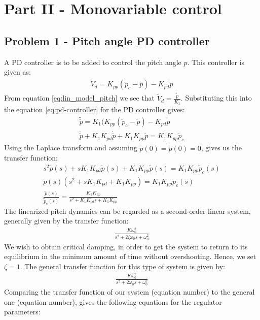 \section{Part II - Monovariable control}
\subsection{Problem 1 - Pitch angle PD controller}
A PD controller is to be added to control the pitch angle $p$. This controller is given as:
\begin{gather}
    \tilde{V}_d = K_{pp}(\tilde{p}_c-\tilde{p})-K_{pd}{\dot{\tilde{p}}}\label{eq:pd-controller}
\end{gather}
From equation \eqref{eq:lin_model_pitch} we see that $\tilde{V}_d = \frac{\ddot{\tilde{p}}}{K_1}.$ Substituting this into the equation \eqref{eq:pd-controller} for the PD controller gives:
\begin{gather*}
    \tilde{\ddot{p}} = K_1(K_{pp}(\tilde{p}_c - \tilde{p}) - K_{pd}\tilde{\dot{p}} \\
    \ddot{\tilde{p}} + K_1K_{pd}\dot{\tilde{p}} + K_1K_{pp}\tilde{p} = K_1 K_{pp} \tilde{p}_c
\end{gather*}
Using the Laplace transform and assuming $\tilde{p}(0) = \dot{\tilde{p}}(0) = 0$, gives us the transfer function:
\begin{gather*}
    s^2\tilde{p}(s) + sK_1K_{pd}\tilde{p}(s) + K_1K_{pp}\tilde{p}(s) = K_1K_{pp}\tilde{p}_c(s) \\
    \tilde{p}(s)(s^2 + sK_1K_{pd} + K_1K_{pp}) = K_1K_{pp}\tilde{p}_c(s) \\
    \frac{\tilde{p}(s)}{\tilde{p}_c(s)} = \frac{K_1K_{pp}}{s^2 + K_1K_{pd}s + K_1K_{pp}}
\end{gather*}
The linearized pitch dynamics can be regarded as a second-order linear system, generally given by the transfer function:
\begin{gather*}
    \frac{K\omega_0^2}{s^2 + 2\zeta\omega_0s + \omega_0^2}
\end{gather*}
We wish to obtain critical damping, in order to get the system to return to its equilibrium in the minimum amount of time without overshooting. Hence, we set $\zeta = 1$. The general transfer function for this type of system is given by:
\begin{gather*}
    \frac{K\omega_0^2}{s^2 + 2\omega_0s + \omega_0^2}
\end{gather*}
Comparing the transfer function of our system (equation number) to the general one (equation number), gives the following equations for the regulator parameters:
